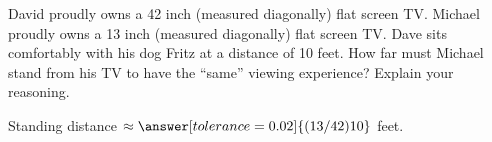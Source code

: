\documentclass[nooutcomes]{ximera}
\begin{document}
\begin{question}
David proudly owns a 42 inch (measured diagonally) flat screen
  TV. Michael proudly owns a 13 inch (measured diagonally) flat screen
  TV. Dave sits comfortably with his dog Fritz at a distance of 10
  feet. How far must Michael stand from his TV to have the ``same''
  viewing experience?  Explain your reasoning.

Standing distance $\approx \answer[tolerance=0.02]{(13/42)10}$ feet.  
\end{question}

\end{document}
